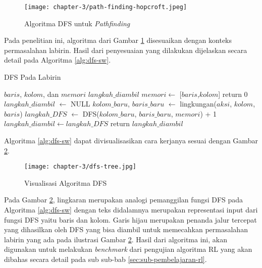 \begin{figure}[H]
	\centering
	\texttt{[image: chapter-3/path-finding-hopcroft.jpeg]}
	\caption{Algoritma \ac{DFS} untuk \textit{Pathfinding} \parencite{hopcroft1973algorithm}}
	\label{fig:hopcroft-dfs}
\end{figure}

Pada penelitian ini, algoritma dari Gambar \ref{fig:hopcroft-dfs} disesuaikan dengan konteks permasalahan labirin. Hasil dari penyesuaian yang dilakukan dijelaskan secara detail pada Algoritma \ref{alg:dfs-sw}.

\begin{algorithm}
	\makeatletter
	\renewcommand{\ALG@name}{Algoritma}
	\makeatother
	\caption{\ac{DFS} Pada Labirin}\label{alg:dfs-sw}
	\renewcommand{\algorithmicrequire}{\textbf{Masukan:}}
	\renewcommand{\algorithmicensure}{\textbf{Keluaran:}}
	\begin{algorithmic}[1]
		\Require $baris$, $kolom$, dan $memori$
		\Ensure $langkah\_diambil$
		\State $memori \gets$ [$baris$,$kolom$]
		\State return 0 \EndIf
		\State $langkah\_diambil$ $\gets$ NULL
		\State $kolom\_baru$, $baris\_baru$ $\gets$ lingkungan($aksi$, $kolom$, $baris$)
		\State $langkah\_DFS$ $\gets$ DFS($kolom\_baru$, $baris\_baru$, $memori$) + 1
		\State $langkah\_diambil \gets langkah\_DFS$
		\EndIf
		\EndIf
		\EndFor
		\State return $langkah\_diambil$
	\end{algorithmic}
\end{algorithm}

Algoritma \ref{alg:dfs-sw} dapat divisualisasikan cara kerjanya sesuai dengan Gambar \ref{fig:dfs-visualization}.

\begin{figure}[H]
	\centering
	\texttt{[image: chapter-3/dfs-tree.jpg]}
	\caption{Visualisasi Algoritma \ac{DFS}}
	\label{fig:dfs-visualization}
\end{figure}

Pada Gambar \ref{fig:dfs-visualization}, lingkaran merupakan analogi pemanggilan fungsi \ac{DFS} pada Algoritma \ref{alg:dfs-sw} dengan teks didalamnya merupakan representasi input dari fungsi \ac{DFS} yaitu baris dan kolom. Garis hijau merupakan penanda jalur tercepat yang dihasilkan oleh DFS yang bisa diambil untuk memecahkan permasalahan labirin yang ada pada ilustrasi Gambar \ref{fig:dfs-visualization}. Hasil dari algoritma ini, akan digunakan untuk melakukan \textit{benchmark} dari pengujian algoritma \ac{RL} yang akan dibahas secara detail pada sub sub-bab \ref{sec:sub-pembelajaran-rl}.

